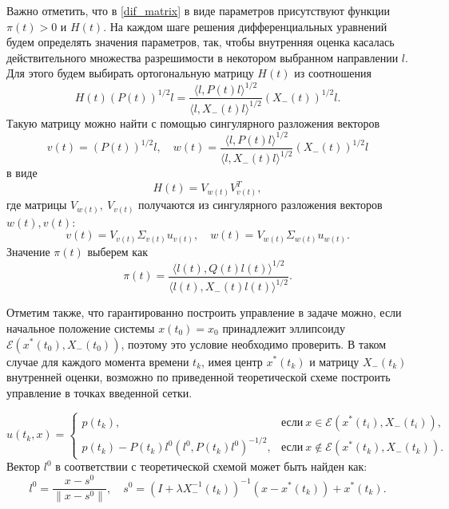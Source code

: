 Важно отметить, что в \eqref{dif_matrix} в виде параметров присутствуют
 функции \( \pi(t) > 0 \) и \( H(t) \). На каждом шаге
 решения дифференциальных уравнений будем определять значения параметров, так, чтобы внутренняя оценка
 касалась действительного множества разрешимости в некотором выбранном направлении \( l \).
 Для этого будем выбирать ортогональную матрицу \( H(t) \) из соотношения
\begin{equation*}
    H(t)(P(t))^{1/2} l = \frac{\langle l, P(t) l \rangle^{1/2}}{\langle l, X_-(t) l \rangle^{1/2}} (X_-(t))^{1/2} l.
\end{equation*}
Такую матрицу можно найти с помощью сингулярного разложения векторов
\begin{equation*}
    v(t) = (P(t))^{1/2} l, \quad w(t) = \frac{\langle l, P(t) l \rangle^{1/2}}{\langle l, X_-(t) l \rangle^{1/2}} (X_-(t))^{1/2} l
\end{equation*}
в виде
\begin{equation*}
    H(t) = V_{w(t)} V_{v(t)}^T,
\end{equation*}
где матрицы \( V_{w(t)}, \ V_{v(t)} \) получаются из сингулярного разложения векторов \( w(t), v(t) \):
\begin{equation*}
    v(t) = V_{v(t)} \Sigma_{v(t)} u_{v(t)}, \quad w(t) = V_{w(t)} \Sigma_{w(t)} u_{w(t)}.
\end{equation*}
Значение \( \pi(t) \) выберем как
\begin{equation*}
    \pi(t) = \frac{\langle l(t), Q(t) l(t) \rangle^{1/2}}{\langle l(t), X_-(t) l(t) \rangle^{1/2}}.
\end{equation*}

Отметим также, что гарантированно построить управление в задаче можно, если начальное положение
 системы \( x(t_0) = x_0 \) принадлежит эллипсоиду \( \mathcal{E}(x^*(t_0), X_-(t_0)) \), 
 поэтому это условие необходимо проверить. В таком случае для каждого момента времени \( t_k \), имея
 центр \( x^*(t_k) \) и матрицу \( X_-(t_k) \) внутренней оценки, возможно по приведенной теоретической
 схеме построить управление в точках введенной сетки.

\begin{equation*}
    u(t_k, x) = \begin{cases}
        p(t_k), & \text{если} \ x \in \mathcal{E}(x^*(t_i), X_-(t_i)), \\
        p(t_k) - P(t_k)l^0(l^0, P(t_k)l^0)^{-1/2}, & \text{если} \ x \notin \mathcal{E}(x^*(t_k), X_-(t_k)). 
    \end{cases}
\end{equation*}
Вектор \( l^0 \) в соответствии с теоретической схемой может быть найден как:
\begin{equation*}
    l^0 = \frac{x - s^0}{\| x - s^0 \|}, \quad s^0 = (I + \lambda X_-^{-1}(t_k))^{-1}(x - x^*(t_k)) + x^*(t_k).
\end{equation*}

